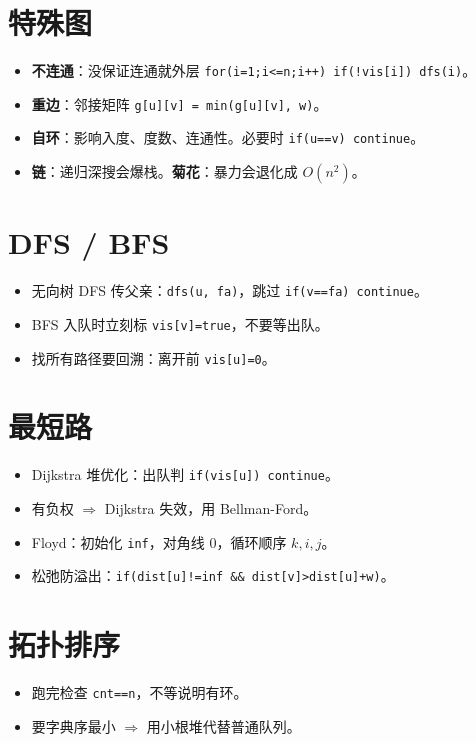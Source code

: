 \documentclass[UTF8,openany,oneside,zihao=-4]{ctexbook}
\begin{document}
\section{特殊图}

\begin{itemize}
  \item \textbf{不连通}：没保证连通就外层 \lstinline|for(i=1;i<=n;i++) if(!vis[i]) dfs(i)|。
  \item \textbf{重边}：邻接矩阵 \lstinline|g[u][v] = min(g[u][v], w)|。
  \item \textbf{自环}：影响入度、度数、连通性。必要时 \lstinline|if(u==v) continue|。
  \item \textbf{链}：递归深搜会爆栈。\textbf{菊花}：暴力会退化成 $O(n^2)$。
\end{itemize}

\section{DFS / BFS}

\begin{itemize}
  \item 无向树 DFS 传父亲：\lstinline|dfs(u, fa)|，跳过 \lstinline|if(v==fa) continue|。
  \item BFS 入队时立刻标 \lstinline|vis[v]=true|，不要等出队。
  \item 找所有路径要回溯：离开前 \lstinline|vis[u]=0|。
\end{itemize}

\section{最短路}

\begin{itemize}
  \item Dijkstra 堆优化：出队判 \lstinline|if(vis[u]) continue|。
  \item 有负权 $\Rightarrow$ Dijkstra 失效，用 Bellman-Ford。
  \item Floyd：初始化 \lstinline|inf|，对角线 0，循环顺序 $k,i,j$。
  \item 松弛防溢出：\lstinline|if(dist[u]!=inf && dist[v]>dist[u]+w)|。
\end{itemize}

\section{拓扑排序}

\begin{itemize}
  \item 跑完检查 \lstinline|cnt==n|，不等说明有环。
  \item 要字典序最小 $\Rightarrow$ 用小根堆代替普通队列。
\end{itemize}
\end{document}
